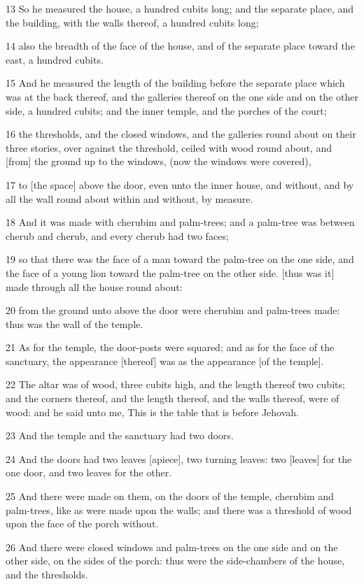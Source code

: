 \par 13 So he measured the house, a hundred cubits long; and the separate place, and the building, with the walls thereof, a hundred cubits long;
\par 14 also the breadth of the face of the house, and of the separate place toward the east, a hundred cubits.
\par 15 And he measured the length of the building before the separate place which was at the back thereof, and the galleries thereof on the one side and on the other side, a hundred cubits; and the inner temple, and the porches of the court;
\par 16 the thresholds, and the closed windows, and the galleries round about on their three stories, over against the threshold, ceiled with wood round about, and [from] the ground up to the windows, (now the windows were covered),
\par 17 to [the space] above the door, even unto the inner house, and without, and by all the wall round about within and without, by measure.
\par 18 And it was made with cherubim and palm-trees; and a palm-tree was between cherub and cherub, and every cherub had two faces;
\par 19 so that there was the face of a man toward the palm-tree on the one side, and the face of a young lion toward the palm-tree on the other side. [thus was it] made through all the house round about:
\par 20 from the ground unto above the door were cherubim and palm-trees made: thus was the wall of the temple.
\par 21 As for the temple, the door-posts were squared; and as for the face of the sanctuary, the appearance [thereof] was as the appearance [of the temple].
\par 22 The altar was of wood, three cubits high, and the length thereof two cubits; and the corners thereof, and the length thereof, and the walls thereof, were of wood: and he said unto me, This is the table that is before Jehovah.
\par 23 And the temple and the sanctuary had two doors.
\par 24 And the doors had two leaves [apiece], two turning leaves: two [leaves] for the one door, and two leaves for the other.
\par 25 And there were made on them, on the doors of the temple, cherubim and palm-trees, like as were made upon the walls; and there was a threshold of wood upon the face of the porch without.
\par 26 And there were closed windows and palm-trees on the one side and on the other side, on the sides of the porch: thus were the side-chambers of the house, and the thresholds.

